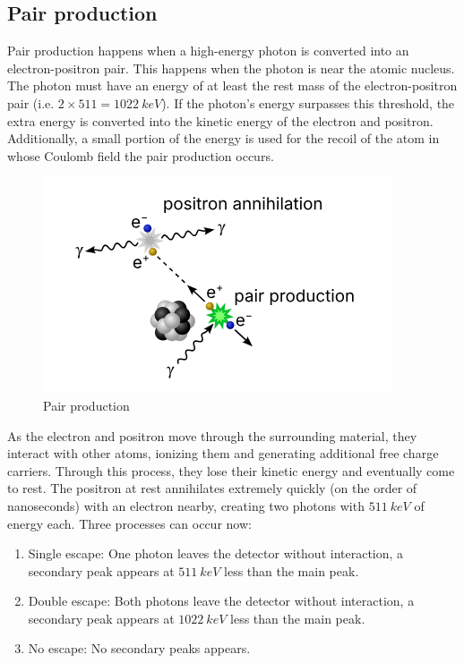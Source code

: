 \documentclass{article}
\begin{document}
\pagebreak{}

\subsection{Pair production}
Pair production happens when a high-energy photon is converted into an electron-positron pair. This happens when the photon is near the atomic nucleus. The photon must have an energy of at least the rest mass of the electron-positron pair (i.e. $2\times511 = \SI{1022}{keV} $). If the photon's energy surpasses this threshold, the extra energy is converted into the kinetic energy of the electron and positron. Additionally, a small portion of the energy is used for the recoil of the atom in whose Coulomb field the pair production occurs. 

\begin{figure}[h]
    \centering
    \includegraphics[width=0.5\linewidth]{Figures/Intro/6.png}
    \caption{Pair production \cite{plotzki_2024_highresolution}}
    \label{fig:Pair production}
\end{figure}

As the electron and positron move through the surrounding material, they interact with other atoms, ionizing them and generating additional free charge carriers. Through this process, they lose their kinetic energy and eventually come to rest. The positron at rest annihilates extremely quickly (on the order of nanoseconds) with an electron nearby, creating two photons with $\SI{511}{keV}$ of energy each. Three processes can occur now: 

\begin{enumerate}
    \item Single escape: One photon leaves the detector without interaction, a secondary peak appears at $\SI{511}{keV}$ less than the main peak.
    \item Double escape: Both photons leave the detector without interaction, a secondary peak appears at $\SI{1022}{keV}$ less than the main peak.
    \item No escape: No secondary peaks appears.
\end{enumerate}
\end{document}
